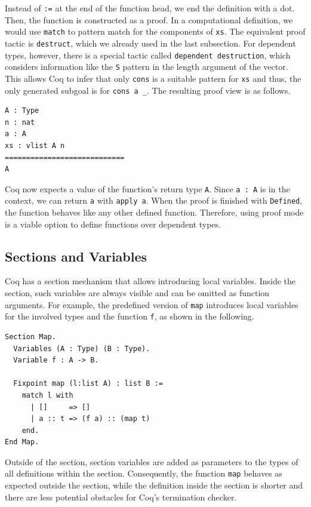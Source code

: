 \documentclass[a4paper, 11pt, fleqn, twoside, abstract=on]{scrreprt}
\newcommand{\cinl}[1]{\texttt{#1}}
\begin{document}
Instead of \cinl{:=} at the end of the function head, we end the definition with a dot.
Then, the function is constructed as a proof.
In a computational definition, we would use \cinl{match} to pattern match for the components of \cinl{xs}.
The equivalent proof tactic is \cinl{destruct}, which we already used in the last subsection.
For dependent types, however, there is a special tactic called \cinl{dependent destruction}, which considers information like the \cinl{S} pattern in the length argument of the vector.
This allows Coq to infer that only \cinl{cons} is a suitable pattern for \cinl{xs} and thus, the only generated subgoal is for \cinl{cons a _}.
The resulting proof view is as follows.

\begin{verbatim}
A : Type
n : nat
a : A
xs : vlist A n
============================
A
\end{verbatim}
\noindent
Coq now expects a value of the function's return type \cinl{A}.
Since \cinl{a : A} is in the context, we can return \cinl{a} with \cinl{apply a}.
When the proof is finished with \cinl{Defined}, the function behaves like any other defined function.
Therefore, using proof mode is a viable option to define functions over dependent types.

\subsection{Sections and Variables}
Coq has a section mechanism that allows introducing local variables.
Inside the section, such variables are always visible and can be omitted as function arguments.
For example, the predefined version of \cinl{map} introduces local variables for the involved types and the function \cinl{f}, as shown in the following.

\begin{verbatim}
Section Map.
  Variables (A : Type) (B : Type).
  Variable f : A -> B.

  Fixpoint map (l:list A) : list B :=
    match l with
      | []     => []
      | a :: t => (f a) :: (map t)
    end.
End Map.
\end{verbatim}

Outside of the section, section variables are added as parameters to the types of all definitions within the section.
Consequently, the function \cinl{map} behaves as expected outside the section, while the definition inside the section is shorter and there are less potential obstacles for Coq's termination checker.
\end{document}
